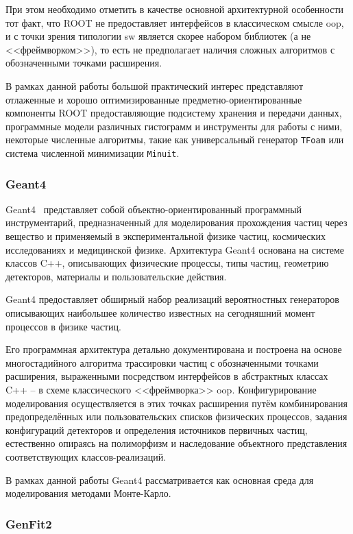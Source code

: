 При этом необходимо отметить в качестве основной архитектурной
особенности тот факт, что ROOT не предоставляет интерфейсов в классическом
смысле \acrshort{oop}, и с точки зрения типологии \acrshort{sw}
является скорее набором библиотек (а не <<фреймворком>>), то есть
не предполагает наличия сложных алгоритмов с обозначенными точками
расширения.

В рамках данной работы большой практический интерес
представляют отлаженные и хорошо
оптимизированные предметно-ориентированные компоненты ROOT
предоставляющие подсистему хранения и передачи данных, программные
модели различных гистограмм и инструменты для работы с ними,
некоторые численные алгоритмы, такие как универсальный генератор
\texttt{TFoam} или система численной минимизации \texttt{Minuit}.

\subsubsection{Geant4}

Geant4~\cite{allison-recent-g4-2016} представляет собой
объектно-ориентированный программный инструментарий, предназначенный для
моделирования прохождения частиц через вещество и применяемый в
экспериментальной физике частиц, космических исследованиях и
медицинской физике. Архитектура Geant4 основана на системе классов C++,
описывающих физические процессы, типы частиц, геометрию
детекторов, материалы и пользовательские действия.

Geant4 предоставляет обширный набор реализаций вероятностных
генераторов описывающих наибольшее количество известных на
сегодняшний момент процессов в физике частиц.

Его программная архитектура детально документирована и построена на основе
многостадийного алгоритма трассировки частиц с обозначенными точками
расширения, выраженными посредством интерфейсов в абстрактных
классах C++ -- в схеме классического <<фреймворка>> \acrshort{oop}.
Конфигурирование моделирования осуществляется в этих точках расширения
путём комбинирования предопределённых или пользовательских списков
физических процессов, задания конфигураций детекторов и определения источников первичных частиц, естественно опираясь на полиморфизм и наследование объектного
представления соответствующих классов-реализаций.

В рамках данной работы Geant4 рассматривается как основная среда для
моделирования методами Монте-Карло.

\subsubsection{GenFit2}


